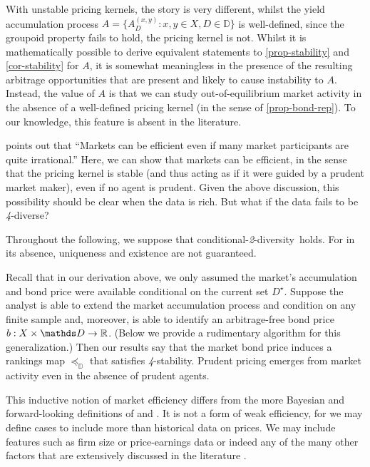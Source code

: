 \documentclass[12pt,a4paper,twoside]{article}
\newcommand{\mbbd}{{\mathds D}}
\newcommand{\past}{{D^\star}}
\newcommand{\xy}{{(x, y)}}
\newcommand{\stability}{\textit{4}-\textup{{stability}}}
\newcommand{\condtwodiv}{\textup{conditional-\textit{2}-diversity}}
\begin{document}
With unstable pricing kernels, the story is very different, whilst the yield
accumulation process $A = \{A^{\xy}_D : x, y \in X, D \in \mbbd\}$ is
well-defined, since the groupoid property fails to hold, the pricing kernel is
not. Whilst it is mathematically possible to derive equivalent statements to
\cref{prop-stability} and \cref{cor-stability} for $A$, it is somewhat
meaningless in the presence of the resulting arbitrage opportunities that are
present and likely to cause instability to $A$.  Instead, the value of $A$ is
that we can study out-of-equilibrium market activity in the absence of a
well-defined pricing kernel (in the sense of \cref{prop-bond-rep}). To our
knowledge, this feature is absent in the literature.


 points out that ``Markets can be
efficient even if many market participants are quite irrational.'' Here, we can
show that markets can be efficient, in the sense that the pricing kernel is
stable (and thus acting as if it were guided by a prudent market maker), even
if no agent is prudent. Given the above discussion, this possibility should be
clear when the data is rich.  But what if the data fails to be
\emph{4}-diverse?

Throughout the following, we suppose that \condtwodiv\ holds. For in its
absence, uniqueness and existence are not guaranteed.

Recall that in our derivation above, we only assumed the market's accumulation
and bond price were available conditional on the current set $\past$. Suppose
the analyst is able to extend the market accumulation process and condition on
any finite sample and, moreover, is able to identify an arbitrage-free bond
price $b: X \times \mbbd \rightarrow \R$. (Below we provide a rudimentary
algorithm for this {generalization}.) Then our results say that the market bond
price induces a rankings map $\preceq_{\mbbd}$ that satisfies \stability.
Prudent pricing emerges from market activity even in the absence of prudent
agents.

This inductive notion of market efficiency differs from the more Bayesian and
forward-looking definitions of \citet{fama1970efficient} and
\citet{malkiel2003efficient}. It is not a form of weak efficiency, for we
may define cases to include more than historical data on prices. We may include
features such as firm size or price-earnings data or indeed any of the many
other factors that are extensively discussed in the literature
\citep{fama2015five,harvey2021lucky,gu2020empirical}.
\end{document}
